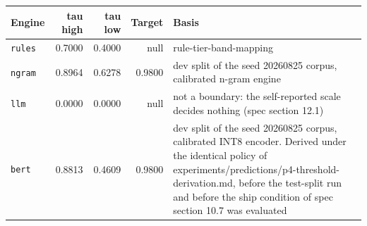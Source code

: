 \begingroup\small\setlength{\tabcolsep}{4pt}
\begin{tabular}{lrrr>{\raggedright\arraybackslash}p{}}
\toprule
\textbf{Engine} & \textbf{tau high} & \textbf{tau low} & \textbf{Target} & \textbf{Basis} \\
\midrule
\texttt{rules} & 0.7000 & 0.4000 & null & rule-tier-band-mapping \\  %
\texttt{ngram} & 0.8964 & 0.6278 & 0.9800 & dev split of the seed 20260825 corpus, calibrated n-gram engine \\  %
\texttt{llm} & 0.0000 & 0.0000 & null & not a boundary: the self-reported scale decides nothing (spec section 12.1) \\  %
\texttt{bert} & 0.8813 & 0.4609 & 0.9800 & dev split of the seed 20260825 corpus, calibrated INT8 encoder. Derived under the identical policy of experiments/predictions/p4-threshold-derivation.md, before the test-split run and before the ship condition of spec section 10.7 was evaluated \\  %
\bottomrule
\end{tabular}
\endgroup
\par\smallskip{}

